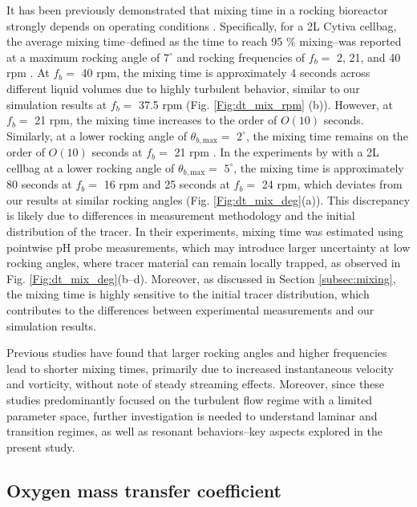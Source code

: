 \documentclass[final,3p,times,twocolumn,authoryear]{elsarticle}
\theoremstyle{definition}
\begin{document}
It has been previously demonstrated that mixing time in a rocking bioreactor strongly depends on operating conditions \citep{Junne2013,Bartczak2022,Seidel2022}. 
Specifically, for a 2L Cytiva cellbag, the average mixing time--defined as the time to reach 95 $\%$ mixing--was reported at a maximum rocking angle of $7^\circ$ and rocking frequencies of $f_b =$ 2, 21, and 40 rpm \citep{Bartczak2022}. At $f_b =$ 40 rpm, the mixing time is approximately 4 seconds across different liquid volumes due to highly turbulent behavior, similar to our simulation results at $f_b=$ 37.5 rpm (Fig. \ref{Fig:dt_mix_rpm} (b)). However, at $f_b =$ 21 rpm, the mixing time increases to the order of $O(10)$ seconds. Similarly, at a lower rocking angle of $\theta_{b,\textrm{max}}=$ $2^{\circ}$, the mixing time remains on the order of $O(10)$ seconds at $f_b=$ 21 rpm \citep{Bartczak2022}. 
In the experiments by \citet{Eibl2009} with a 2L cellbag at a lower rocking angle of $\theta_{b,\textrm{max}}=$ $5^{\circ}$, the mixing time is approximately 80 seconds at $f_b=$ 16 rpm and 25 seconds at $f_b=$ 24 rpm, which deviates from our results at similar rocking angles (Fig. \ref{Fig:dt_mix_deg}(a)). This discrepancy is likely due to differences in measurement methodology and the initial distribution of the tracer. In their experiments, mixing time was estimated using pointwise pH probe measurements, which may introduce larger uncertainty at low rocking angles, where tracer material can remain locally trapped, as observed in Fig. \ref{Fig:dt_mix_deg}(b--d). Moreover, as discussed in Section \ref{subsec:mixing}, the mixing time is highly sensitive to the initial tracer distribution, which contributes to the differences between experimental measurements and our simulation results.

Previous studies have found that larger rocking angles and higher frequencies lead to shorter mixing times, primarily due to increased instantaneous velocity and vorticity, without note of steady streaming effects. Moreover, since these studies predominantly focused on the turbulent flow regime with a limited parameter space, further investigation is needed to understand laminar and transition regimes, as well as resonant behaviors--key aspects explored in the present study.


\subsection{Oxygen mass transfer coefficient} \label{subsec:results-oxy}
\end{document}
